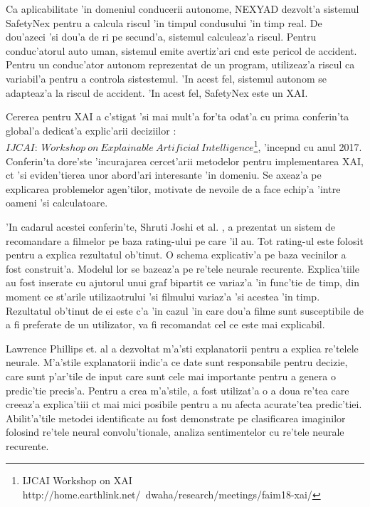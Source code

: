 \documentclass[12pt,a4paper,twoside]{report}
\begin{document}
Ca aplicabilitate 'in domeniul conducerii autonome, NEXYAD dezvolt'a sistemul SafetyNex \cite{safetyNex} pentru a calcula riscul 'in  timpul condusului 'in timp real. De dou'azeci 'si dou'a de ri pe secund'a, sistemul calculeaz'a riscul. Pentru conduc'atorul auto uman, sistemul emite avertiz'ari c\ia nd este pericol de accident. Pentru un conduc'ator autonom reprezentat de un program, utilizeaz'a riscul ca variabil'a pentru a controla sistestemul. 'In acest fel, sistemul autonom se adapteaz'a la riscul de accident. 'In acest fel, SafetyNex este un XAI.

Cererea pentru XAI a c\ia 'stigat 'si mai mult'a for'ta odat'a cu prima conferin'ta global'a dedicat'a explic'arii deciziilor :$IJCAI:\ Workshop\ on\ Explainable\ Artificial\ Intelligence$\footnote{IJCAI Workshop on XAI http://home.earthlink.net/~dwaha/research/meetings/faim18-xai/}, 'incep\ia nd cu anul 2017. Conferin'ta dore'ste 'incurajarea cercet'arii metodelor pentru implementarea XAI, c\ia t 'si eviden'tierea unor abord'ari interesante 'in domeniu. Se axeaz'a pe explicarea problemelor agen'tilor, motivate de nevoile de a face echip'a 'intre oameni 'si calculatoare. 

'In cadarul acestei conferin'te, Shruti Joshi et al. \cite{BharadhwajExplanationsRecommendations}, a prezentat un sistem de recomandare a filmelor pe baza rating-ului pe care 'il au. Tot rating-ul este folosit pentru a explica rezultatul ob'tinut. O schema explicativ'a pe baza vecinilor a fost construit'a. Modelul lor se bazeaz'a pe re'tele neurale recurente. Explica'tiile au fost inserate cu ajutorul unui graf bipartit ce variaz'a 'in func'tie de timp, din moment ce st'arile utilizaotrului 'si filmului variaz'a 'si acestea 'in timp. Rezultatul ob'tinut de ei este c'a 'in cazul 'in care dou'a filme sunt susceptibile de a fi preferate de un utilizator, va fi recomandat cel ce este mai explicabil.

Lawrence Phillips et. al \cite{PhillipsWorkshopIN-TERPRETABILITY} a dezvoltat m'a'sti explanatorii pentru a explica re'telele neurale. M'a'stile explanatorii indic'a ce date sunt responsabile pentru decizie, care sunt p'ar'tile de input care sunt cele mai importante pentru a genera o predic'tie precis'a. Pentru a crea m'a'stile, a fost utilizat'a o a doua re'tea care creeaz'a explica'tiii c\ia t mai mici posibile pentru a nu afecta acurate'tea predic'tiei. Abilit'a'tile metodei identificate au fost demonstrate pe clasificarea imaginilor folosind re'tele neural convolu'tionale, analiza sentimentelor cu re'tele neurale recurente.
\end{document}
